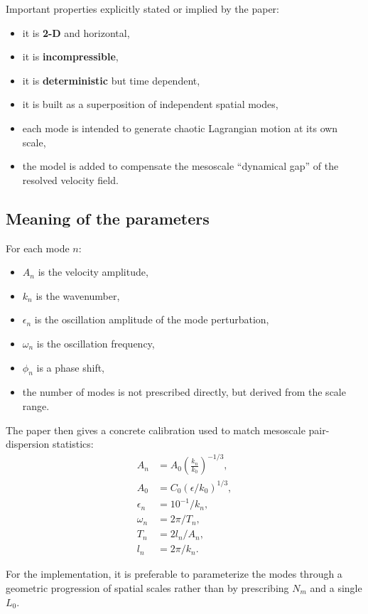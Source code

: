 \documentclass[11pt,a4paper]{article}
\begin{document}
	Important properties explicitly stated or implied by the paper:
	\begin{itemize}[leftmargin=1.5em]
		\item it is \textbf{2-D} and horizontal,
		\item it is \textbf{incompressible},
		\item it is \textbf{deterministic} but time dependent,
		\item it is built as a superposition of independent spatial modes,
		\item each mode is intended to generate chaotic Lagrangian motion at its own scale,
		\item the model is added to compensate the mesoscale ``dynamical gap'' of the resolved velocity field.
	\end{itemize}
	
	\subsection{Meaning of the parameters}
	
	For each mode $n$:
	\begin{itemize}[leftmargin=1.5em]
		\item $A_n$ is the velocity amplitude,
		\item $k_n$ is the wavenumber,
		\item $\epsilon_n$ is the oscillation amplitude of the mode perturbation,
		\item $\omega_n$ is the oscillation frequency,
		\item $\phi_n$ is a phase shift,
		\item the number of modes is not prescribed directly, but derived from the scale range.
	\end{itemize}
	
	The paper then gives a concrete calibration used to match mesoscale pair-dispersion statistics:
	\begin{align}
		A_n &= A_0 \left(\frac{k_n}{k_0}\right)^{-1/3}, \\
		A_0 &= C_0 (\epsilon/ k_0)^{1/3}, \\
		\epsilon_n &= 10^{-1} / k_n, \\
		\omega_n &= 2\pi / T_n, \\
		T_n &= 2 l_n / A_n, \\
		l_n &= 2\pi / k_n.
	\end{align}
	
	For the implementation, it is preferable to parameterize the modes through a geometric progression of spatial scales rather than by prescribing $N_m$ and a single $L_0$.
	
\end{document}
